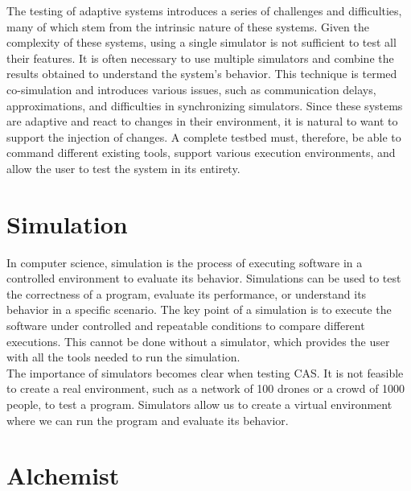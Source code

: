 \documentclass[12pt,a4paper,openright,twoside]{book}
\begin{document}
The testing of adaptive systems introduces a series of challenges and difficulties, many of which stem from the intrinsic nature of these systems. 
Given the complexity of these systems, using a single simulator is not sufficient to test all their features. 
It is often necessary to use multiple simulators and combine the results obtained to understand the system's behavior. 
This technique is termed co-simulation and introduces various issues, such as communication delays, approximations, and difficulties in synchronizing simulators. \cite{DBLP:journals/simpra/ThuleLGML19}
Since these systems are adaptive and react to changes in their environment, it is natural to want to support the injection of changes. \cite{DBLP:conf/icac/BrownHHLLSY04}
A complete testbed must, therefore, be able to command different existing tools, support various execution environments, and allow the user to test the system in its entirety.

\section{Simulation}

In computer science, simulation is the process of executing software in a controlled environment to evaluate its behavior. 
Simulations can be used to test the correctness of a program, evaluate its performance, or understand its behavior in a specific scenario. 
The key point of a simulation is to execute the software under controlled and repeatable conditions to compare different executions. 
This cannot be done without a simulator, which provides the user with all the tools needed to run the simulation. \cite{argun2021simulation, bagrodia1998parsec} \\
The importance of simulators becomes clear when testing \ac{CAS}. 
It is not feasible to create a real environment, such as a network of 100 drones or a crowd of 1000 people, to test a program.
Simulators allow us to create a virtual environment where we can run the program and evaluate its behavior. \\

\section{Alchemist}
\end{document}
